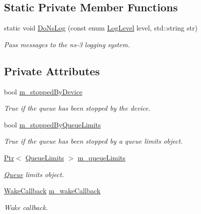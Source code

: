\subsection*{Static Private Member Functions}
\begin{DoxyCompactItemize}
\item 
static void \hyperlink{classns3_1_1NetDeviceQueue_a638a4fa522a75c1c91a8ba303f3000ec}{Do\+Ns\+Log} (const enum \hyperlink{namespacens3_aa6464a4d69551a9cc968e17a65f39bdb}{Log\+Level} level, std\+::string str)
\begin{DoxyCompactList}\small\item\em Pass messages to the ns-\/3 logging system. \end{DoxyCompactList}\end{DoxyCompactItemize}
\subsection*{Private Attributes}
\begin{DoxyCompactItemize}
\item 
bool \hyperlink{classns3_1_1NetDeviceQueue_ae0ffd8982c7000674eac6948a398f3de}{m\+\_\+stopped\+By\+Device}
\begin{DoxyCompactList}\small\item\em True if the queue has been stopped by the device. \end{DoxyCompactList}\item 
bool \hyperlink{classns3_1_1NetDeviceQueue_a025451a1ed0b95ba3e10b1597f1b3873}{m\+\_\+stopped\+By\+Queue\+Limits}
\begin{DoxyCompactList}\small\item\em True if the queue has been stopped by a queue limits object. \end{DoxyCompactList}\item 
\hyperlink{classns3_1_1Ptr}{Ptr}$<$ \hyperlink{classns3_1_1QueueLimits}{Queue\+Limits} $>$ \hyperlink{classns3_1_1NetDeviceQueue_a29a6c2635a83e3ea45365a3a0a839639}{m\+\_\+queue\+Limits}
\begin{DoxyCompactList}\small\item\em \hyperlink{classns3_1_1Queue}{Queue} limits object. \end{DoxyCompactList}\item 
\hyperlink{classns3_1_1NetDeviceQueue_af33b3e91885b68cc983c87b131826300}{Wake\+Callback} \hyperlink{classns3_1_1NetDeviceQueue_abfc6b3a5c3cbbd967400751e7184b2d7}{m\+\_\+wake\+Callback}
\begin{DoxyCompactList}\small\item\em Wake callback. \end{DoxyCompactList}\end{DoxyCompactItemize}


